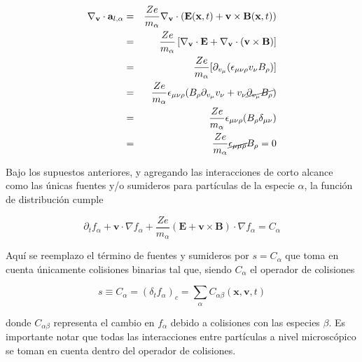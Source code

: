 \begin{eqnarray}
  \nabla_\textbf{v}\cdot\textbf{a}_{l, \alpha} &=& \frac{Ze}{m_\alpha}\nabla_\textbf{v}\cdot(\textbf{E}(\textbf{x},t) + \textbf{v}\times\textbf{B}(\textbf{x},t))\nonumber\\
                                   &=& \frac{Ze}{m_\alpha}\left[\nabla_\textbf{v}\cdot \textbf{E} + \nabla_\textbf{v}\cdot(\textbf{v}\times\textbf{B})\right] \nonumber\\
                                   &=& \frac{Ze}{m_\alpha}[\partial_{v_\mu} (\epsilon_{\mu\nu\rho} v_{\nu}B_{\rho})] \nonumber \\
                                   &=& \frac{Ze}{m_\alpha}\epsilon_{\mu\nu\rho}(B_\rho \partial_{v_\mu}v_{\nu} + v_\nu\cancel{\partial_{v_\mu}B_\rho}) \nonumber \\
                                   &=& \frac{Ze}{m_\alpha}\epsilon_{\mu\nu\rho}(B_\rho\delta_{\mu\nu})\nonumber \\
                                   &=& \frac{Ze}{m_\alpha}\cancel{\epsilon_{\mu\mu\rho}}B_\rho = 0
\end{eqnarray}

Bajo los supuestos anteriores, y agregando las interacciones de corto alcance como las \'unicas fuentes y/o sumideros para part\'iculas de la especie $\alpha$, la funci\'on de distribuci\'on cumple 

\begin{equation}
  \partial_t f_\alpha + \textbf{v}\cdot\nabla f_\alpha + \frac{Ze}{m_\alpha}(\textbf{E} + \textbf{v}\times\textbf{B})\cdot\nabla f_\alpha = C_\alpha
\end{equation}

Aqu\'i se reemplazo el t\'ermino de fuentes y sumideros por $s = C_\alpha$ que toma en cuenta \'unicamente colisiones binarias tal que, siendo $C_\alpha$ el operador de colisiones

\begin{equation}
  s \equiv C_\alpha = (\delta_t f_\alpha)_c = \sum_\alpha C_{\alpha\beta}(\textbf{x}, \textbf{v},t)
\end{equation}

donde $C_{\alpha\beta}$ representa el cambio en $f_\alpha$ debido a colisiones con las especies $\beta$. Es importante notar que todas las interacciones entre part\'iculas a nivel microsc\'opico se toman en cuenta dentro del operador de colisiones.
